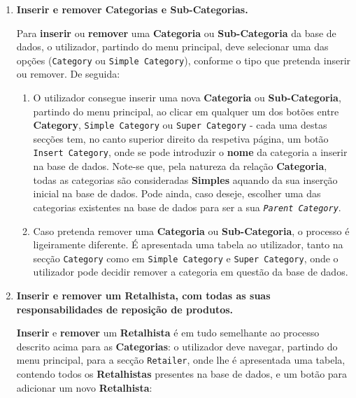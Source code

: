 \documentclass[12pt,a4paper]{article}
\begin{document}
\begin{enumerate}
  \item \textbf{Inserir e remover Categorias e Sub-Categorias.}

        Para \textbf{inserir} ou \textbf{remover} uma \textbf{Categoria} ou \textbf{Sub-Categoria}
        da base de dados, o utilizador, partindo do menu principal, deve selecionar
        uma das opções (\texttt{Category} ou \texttt{Simple Category}), conforme o tipo
        que pretenda inserir ou remover. De seguida:

        \begin{enumerate}
          \item O utilizador consegue inserir uma nova \textbf{Categoria} ou \textbf{Sub-Categoria}, partindo
                do menu principal, ao clicar em qualquer um dos botões entre \textbf{Category},
                \texttt{Simple Category} ou \texttt{Super Category} - cada uma destas secções
                tem, no canto superior direito da respetiva página, um botão \texttt{Insert Category}, onde se pode
                introduzir o \textbf{nome} da categoria a inserir na base de dados. Note-se que,
                pela natureza da relação \textbf{Categoria}, todas as categorias são consideradas
                \textbf{Simples} aquando da sua inserção inicial na base de dados. Pode ainda, caso deseje,
                escolher uma das categorias existentes na base de dados para ser a sua
                \textit{\texttt{Parent Category}}.

          \item Caso pretenda remover uma \textbf{Categoria} ou \textbf{Sub-Categoria},
                o processo é ligeiramente diferente. É apresentada uma tabela ao utilizador,
                tanto na secção \texttt{Category} como em \texttt{Simple Category} e \texttt{Super Category}, onde o utilizador
                pode decidir remover a categoria em questão da base de dados.
        \end{enumerate}

  \item \textbf{Inserir e remover um Retalhista, com todas as suas responsabilidades
          de reposição de produtos.}

        \textbf{Inserir} e \textbf{remover} um \textbf{Retalhista} é em tudo semelhante ao processo
        descrito acima para as \textbf{Categorias}: o utilizador deve navegar,
        partindo do menu principal, para a secção \texttt{Retailer}, onde lhe é
        apresentada uma tabela, contendo todos os \textbf{Retalhistas} presentes na
        base de dados, e um botão para adicionar um novo \textbf{Retalhista}:


\end{enumerate}
\end{document}
